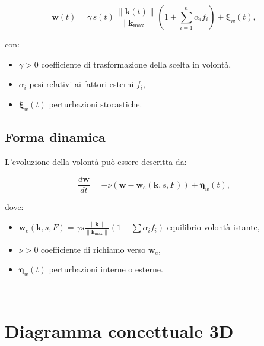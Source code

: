 \documentclass[12pt,a4paper]{article}
\begin{document}
\begin{equation}
\bm{w}(t) = \gamma \, s(t) \, \frac{\|\bm{k}(t)\|}{\|\bm{k}_{\max}\|} \left(1 + \sum_{i=1}^{n} \alpha_i f_i \right) + \bm{\xi}_w(t),
\end{equation}

con:

\begin{itemize}
    \item $\gamma>0$ coefficiente di trasformazione della scelta in volontà,
    \item $\alpha_i$ pesi relativi ai fattori esterni $f_i$,
    \item $\bm{\xi}_w(t)$ perturbazioni stocastiche.
\end{itemize}

\subsection{Forma dinamica}

L’evoluzione della volontà può essere descritta da:

\begin{equation}
\frac{d\bm{w}}{dt} = -\nu (\bm{w} - \bm{w}_e(\bm{k},s,F)) + \bm{\eta}_w(t),
\end{equation}

dove:

\begin{itemize}
    \item $\bm{w}_e(\bm{k},s,F) = \gamma s \frac{\|\bm{k}\|}{\|\bm{k}_{\max}\|} (1 + \sum \alpha_i f_i)$ equilibrio volontà-istante,
    \item $\nu>0$ coefficiente di richiamo verso $\bm{w}_e$,
    \item $\bm{\eta}_w(t)$ perturbazioni interne o esterne.
\end{itemize}

---

\section{Diagramma concettuale 3D}

\begin{center}
\end{center}
\end{document}
